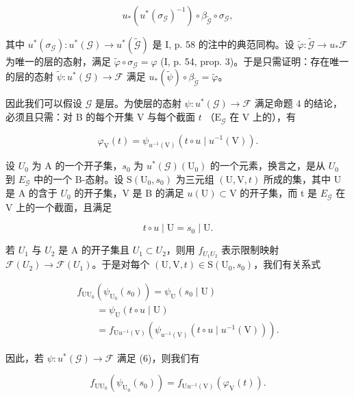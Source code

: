 \[
u _ {*} (u ^ {*} (\sigma_ {\mathcal {G}}) ^ {- 1}) \circ \beta_ {\widetilde {\mathcal {G}}} \circ \sigma_ {\mathcal {G}},
\]

其中 \(u^{*}(\sigma_{\mathcal{G}}) \colon u^{*}(\mathcal{G}) \to u^{*}(\widetilde{\mathcal{G}})\) 是 I, p. 58 的注中的典范同构。设 \(\widetilde{\varphi} \colon \widetilde{\mathcal{G}} \to u_{*}\mathcal{F}\) 为唯一的层的态射，满足 \(\widetilde{\varphi} \circ \sigma_{\mathcal{G}} = \varphi\) (I, p. 54, prop. 3)。于是只需证明：存在唯一的层的态射 \(\widetilde{\psi} \colon u^{*}(\mathcal{G}) \to \mathcal{F}\) 满足 \(u_{*}(\widetilde{\psi}) \circ \beta_{\widetilde{\mathcal{G}}} = \widetilde{\varphi}\)。

因此我们可以假设 \(\mathcal{G}\) 是层。为使层的态射 \(\psi: u^{*}(\mathcal{G}) \to \mathcal{F}\) 满足命题 4 的结论，必须且只需：对 B 的每个开集 V 与每个截面 \(t\) （\(\mathrm{E}_{\mathcal{G}}\) 在 V 上的），有

\[
\varphi_{\mathrm{V}}(t) = \psi_{u^{-1}(\mathrm{V})}(t \circ u \mid u^{-1}(\mathrm{V})).\tag{6}
\]

设 \(U_{0}\) 为 A 的一个开子集，\(s_{0}\) 为 \(u^{*}(\mathcal{G})(\mathrm{U}_{0})\) 的一个元素，换言之，是从 \(U_{0}\) 到 \(E_{\mathcal{G}}\) 中的一个 B-态射。设 \(\mathrm{S}(\mathrm{U}_{0}, s_{0})\) 为三元组 \((\mathrm{U}, \mathrm{V}, t)\) 所成的集，其中 U 是 A 的含于 \(U_{0}\) 的开子集，V 是 B 的满足 \(u(\mathrm{U}) \subset \mathrm{V}\) 的开子集，而 t 是 \(E_{\mathcal{G}}\) 在 V 上的一个截面，且满足

\[
t \circ u \mid \mathrm{U} = s _ {0} \mid \mathrm{U}.\tag{7}
\]

若 \(U_{1}\) 与 \(U_{2}\) 是 A 的开子集且 \(U_{1} \subset U_{2}\)，则用 \(f_{U_{1}U_{2}}\) 表示限制映射 \(\mathcal{F}(U_{2}) \to \mathcal{F}(U_{1})\)。于是对每个 \((\mathrm{U}, \mathrm{V}, t) \in \mathrm{S}(\mathrm{U}_{0}, s_{0})\)，我们有关系式

\[
\begin{array}{l} f_{\mathrm{U}\mathrm{U}_{0}}(\psi_{\mathrm{U}_{0}}(s_{0})) = \psi_{\mathrm{U}}(s_{0} \mid \mathrm{U}) \\ \qquad = \psi_{\mathrm{U}}(t \circ u \mid \mathrm{U}) \\ \qquad = f_{\mathrm{U}u^{-1}(\mathrm{V})}(\psi_{u^{-1}(\mathrm{V})}(t \circ u \mid u^{-1}(\mathrm{V}))). \end{array}
\]

因此，若 \(\psi \colon u^{*}(\mathcal{G})\to \mathcal{F}\) 满足 (6)，则我们有

\[
f_{\mathrm{U}\mathrm{U}_{0}}(\psi_{\mathrm{U}_{0}}(s_{0})) = f_{\mathrm{U}u^{-1}(\mathrm{V})}(\varphi_{\mathrm{V}}(t)).\tag{8}
\]

